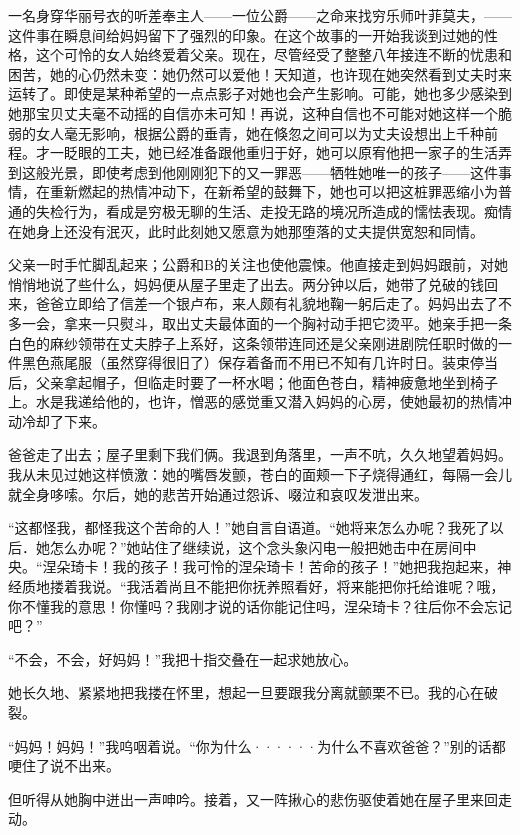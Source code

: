 \documentclass[12pt, UTF8]{ctexbook}
\begin{document}
\par 一名身穿华丽号衣的听差奉主人——一位公爵——之命来找穷乐师叶菲莫夫，——这件事在瞬息间给妈妈留下了强烈的印象。在这个故事的一开始我谈到过她的性格，这个可怜的女人始终爱着父亲。现在，尽管经受了整整八年接连不断的忧患和困苦，她的心仍然未变：她仍然可以爱他！天知道，也许现在她突然看到丈夫时来运转了。即使是某种希望的一点点影子对她也会产生影响。可能，她也多少感染到她那宝贝丈夫毫不动摇的自信亦未可知！再说，这种自信也不可能对她这样一个脆弱的女人毫无影响，根据公爵的垂青，她在倏忽之间可以为丈夫设想出上千种前程。才一眨眼的工夫，她已经准备跟他重归于好，她可以原宥他把一家子的生活弄到这般光景，即使考虑到他刚刚犯下的又一罪恶——牺牲她唯一的孩子——这件事情，在重新燃起的热情冲动下，在新希望的鼓舞下，她也可以把这桩罪恶缩小为普通的失检行为，看成是穷极无聊的生活、走投无路的境况所造成的懦怯表现。痴情在她身上还没有泯灭，此时此刻她又愿意为她那堕落的丈夫提供宽恕和同情。
\par 父亲一时手忙脚乱起来；公爵和B的关注也使他震悚。他直接走到妈妈跟前，对她悄悄地说了些什么，妈妈便从屋子里走了出去。两分钟以后，她带了兑破的钱回来，爸爸立即给了信差一个银卢布，来人颇有礼貌地鞠一躬后走了。妈妈出去了不多一会，拿来一只熨斗，取出丈夫最体面的一个胸衬动手把它烫平。她亲手把一条白色的麻纱领带在丈夫脖子上系好，这条领带连同还是父亲刚进剧院任职时做的一件黑色燕尾服（虽然穿得很旧了）保存着备而不用已不知有几许时日。装束停当后，父亲拿起帽子，但临走时要了一杯水喝；他面色苍白，精神疲惫地坐到椅子上。水是我递给他的，也许，憎恶的感觉重又潜入妈妈的心房，使她最初的热情冲动冷却了下来。
\par 爸爸走了出去；屋子里剩下我们俩。我退到角落里，一声不吭，久久地望着妈妈。我从未见过她这样愤激：她的嘴唇发颤，苍白的面颊一下子烧得通红，每隔一会儿就全身哆嗦。尔后，她的悲苦开始通过怨诉、啜泣和哀叹发泄出来。
\par “这都怪我，都怪我这个苦命的人！”她自言自语道。“她将来怎么办呢？我死了以后．她怎么办呢？”她站住了继续说，这个念头象闪电一般把她击中在房间中央。“涅朵琦卡！我的孩子！我可怜的涅朵琦卡！苦命的孩子！”她把我抱起来，神经质地搂着我说。“我活着尚且不能把你抚养照看好，将来能把你托给谁呢？哦，你不懂我的意思！你懂吗？我刚才说的话你能记住吗，涅朵琦卡？往后你不会忘记吧？”
\par “不会，不会，好妈妈！”我把十指交叠在一起求她放心。
\par 她长久地、紧紧地把我搂在怀里，想起一旦要跟我分离就颤栗不已。我的心在破裂。
\par “妈妈！妈妈！”我呜咽着说。“你为什么······为什么不喜欢爸爸？”别的话都哽住了说不出来。
\par 但听得从她胸中迸出一声呻吟。接着，又一阵揪心的悲伤驱使着她在屋子里来回走动。
\end{document}
